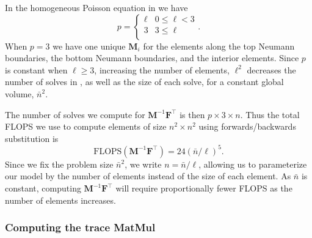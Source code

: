 %
%
%
\begin{aside}
	In the homogeneous Poisson equation in  we have 
	\begin{equation}
		p = \begin{cases}
		    \ell &  0 \leq \ell < 3 \\ 
			3 &  3 \leq \ell \\ 
		\end{cases}.
	\end{equation} 
	\noindent 
	When $p = 3$ we have one unique $\textbf{M}_i$ for the elements along the top Neumann boundaries, the bottom Neumann boundaries, and the interior elements. 
	Since $p$ is constant when $\ell \geq 3$, increasing the number of elements, $\ell^2$ decreases the number of solves in , as well as the size of each solve, for a constant global volume, $\bar{n}^2$. 
\end{aside}

%
%
%
\noindent
The number of solves we compute for $\textbf{M}^{-1}\textbf{F}^\intercal$ is then $p \times 3 \times n$.
Thus the total FLOPS we use to compute elements of size $n^2 \times n^2$ using forwards/backwards substitution is 
\begin{equation}
	\text{FLOPS}(\textbf{M}^{-1}\textbf{F}^\intercal) = 24 (\bar{n}/\ell)^5.
	\label{eqn:flops_mf}
\end{equation}
\noindent
Since we fix the problem size $\bar{n}^2$, we write $n = \bar{n}/\ell$, allowing us to parameterize our model by the number of elements instead of the size of each element. 
As $\bar{n}$ is constant, computing $\textbf{M}^{-1}\textbf{F}^\intercal$ will require proportionally fewer FLOPS as the number of elements increases.

%
%
%
\subsubsection{Computing the trace MatMul} 

